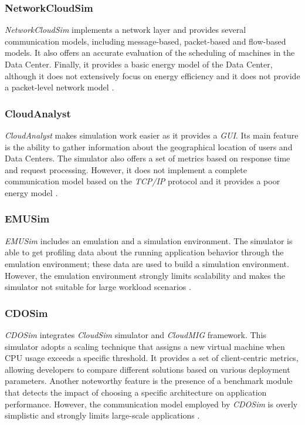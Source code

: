 {\subsubsection{NetworkCloudSim}
\emph{NetworkCloudSim} \cite{garg2011networkcloudsim} implements a network layer and  provides several communication models, including message-based, packet-based and flow-based models. It also offers an accurate evaluation of the scheduling of machines in the Data Center. Finally, it provides a basic energy model of the Data Center, although it does not extensively focus on energy efficiency and it does not provide a packet-level network model \cite{mansouri2020cloud} \cite{patel2016comprehensive}.
\subsubsection*{CloudAnalyst}
\emph{CloudAnalyst} \cite{wickremasinghe2010cloudanalyst} makes simulation work easier as it provides a \emph{GUI}. Its main feature is the ability to gather information about the geographical location of users and Data Centers. The simulator also offers a set of metrics based on response time and request processing. However, it does not implement a complete communication model based on the \emph{TCP/IP} protocol and it provides a poor energy model \cite{mansouri2020cloud}. 
\subsubsection{EMUSim}
\emph{EMUSim} \cite{calheiros2013emusim} includes an emulation and a simulation environment. The simulator is able to get profiling data about the running application behavior through the emulation environment; these data are used to build a simulation environment. However, the emulation environment strongly limits scalability and makes the simulator not suitable for large workload scenarios \cite{mansouri2020cloud}. 
\subsubsection*{CDOSim}
\emph{CDOSim} \cite{fittkau2012cdosim} integrates \emph{CloudSim} simulator and \emph{CloudMIG} framework. This simulator adopts a scaling technique that assigns a new virtual machine when CPU usage exceeds a specific threshold.  It provides a set of client-centric metrics, allowing developers to compare different solutions based on various deployment parameters. Another noteworthy feature is the presence of a benchmark module that detects the impact of choosing a specific architecture on application performance. However, the communication model employed by \emph{CDOSim} is overly simplistic and strongly limits large-scale applications \cite{mansouri2020cloud}.
}
